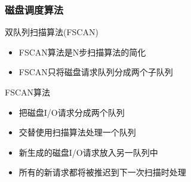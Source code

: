 \begin{frame}[fragile]
    \frametitle{磁盘调度算法}
    双队列扫描算法(FSCAN)
    \begin{itemize}
        \item FSCAN算法是N步扫描算法的简化
        \item FSCAN只将磁盘请求队列分成两个子队列
    \end{itemize}
    FSCAN算法
    \begin{itemize}
        \item 把磁盘I/O请求分成两个队列
        \item 交替使用扫描算法处理一个队列
        \item 新生成的磁盘I/O请求放入另一队列中
        \item 所有的新请求都将被推迟到下一次扫描时处理        
    \end{itemize}
\end{frame}

